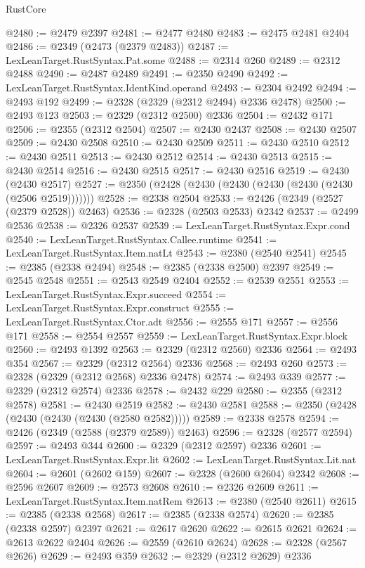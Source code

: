 \begin{lexlean}{RustCore}
\begin{coremodule}
@2480 := @2479 @2397
@2481 := @2477 @2480
@2483 := @2475 @2481 @2404
@2486 := @2349 (@2473 (@2379 @2483))
@2487 := LexLeanTarget.RustSyntax.Pat.some
@2488 := @2314 @260
@2489 := @2312 @2488
@2490 := @2487 @2489
@2491 := @2350 @2490
@2492 := LexLeanTarget.RustSyntax.IdentKind.operand
@2493 := @2304 @2492
@2494 := @2493 @192
@2499 := @2328 (@2329 (@2312 @2494) @2336 @2478)
@2500 := @2493 @123
@2503 := @2329 (@2312 @2500) @2336
@2504 := @2432 @171
@2506 := @2355 (@2312 @2504)
@2507 := @2430 @2437
@2508 := @2430 @2507
@2509 := @2430 @2508
@2510 := @2430 @2509
@2511 := @2430 @2510
@2512 := @2430 @2511
@2513 := @2430 @2512
@2514 := @2430 @2513
@2515 := @2430 @2514
@2516 := @2430 @2515
@2517 := @2430 @2516
@2519 := @2430 (@2430 @2517)
@2527 := @2350 (@2428 (@2430 (@2430 (@2430 (@2430 (@2430 (@2506 @2519)))))))
@2528 := @2338 @2504
@2533 := @2426 (@2349 (@2527 (@2379 @2528)) @2463)
@2536 := @2328 (@2503 @2533) @2342
@2537 := @2499 @2536
@2538 := @2326 @2537
@2539 := LexLeanTarget.RustSyntax.Expr.cond
@2540 := LexLeanTarget.RustSyntax.Callee.runtime
@2541 := LexLeanTarget.RustSyntax.Item.natLt
@2543 := @2380 (@2540 @2541)
@2545 := @2385 (@2338 @2494)
@2548 := @2385 (@2338 @2500) @2397
@2549 := @2545 @2548
@2551 := @2543 @2549 @2404
@2552 := @2539 @2551
@2553 := LexLeanTarget.RustSyntax.Expr.succeed
@2554 := LexLeanTarget.RustSyntax.Expr.construct
@2555 := LexLeanTarget.RustSyntax.Ctor.adt
@2556 := @2555 @171
@2557 := @2556 @171
@2558 := @2554 @2557
@2559 := LexLeanTarget.RustSyntax.Expr.block
@2560 := @2493 @1392
@2563 := @2329 (@2312 @2560) @2336
@2564 := @2493 @354
@2567 := @2329 (@2312 @2564) @2336
@2568 := @2493 @260
@2573 := @2328 (@2329 (@2312 @2568) @2336 @2478)
@2574 := @2493 @339
@2577 := @2329 (@2312 @2574) @2336
@2578 := @2432 @229
@2580 := @2355 (@2312 @2578)
@2581 := @2430 @2519
@2582 := @2430 @2581
@2588 := @2350 (@2428 (@2430 (@2430 (@2430 (@2580 @2582)))))
@2589 := @2338 @2578
@2594 := @2426 (@2349 (@2588 (@2379 @2589)) @2463)
@2596 := @2328 (@2577 @2594)
@2597 := @2493 @344
@2600 := @2329 (@2312 @2597) @2336
@2601 := LexLeanTarget.RustSyntax.Expr.lit
@2602 := LexLeanTarget.RustSyntax.Lit.nat
@2604 := @2601 (@2602 @159)
@2607 := @2328 (@2600 @2604) @2342
@2608 := @2596 @2607
@2609 := @2573 @2608
@2610 := @2326 @2609
@2611 := LexLeanTarget.RustSyntax.Item.natRem
@2613 := @2380 (@2540 @2611)
@2615 := @2385 (@2338 @2568)
@2617 := @2385 (@2338 @2574)
@2620 := @2385 (@2338 @2597) @2397
@2621 := @2617 @2620
@2622 := @2615 @2621
@2624 := @2613 @2622 @2404
@2626 := @2559 (@2610 @2624)
@2628 := @2328 (@2567 @2626)
@2629 := @2493 @359
@2632 := @2329 (@2312 @2629) @2336

\end{coremodule}
\end{lexlean}
